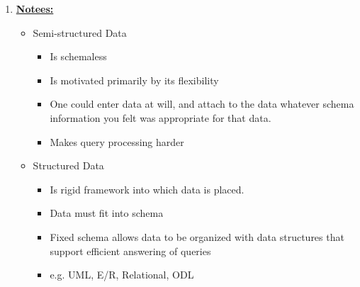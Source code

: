 \documentclass[12pt]{article}
\begin{document}
\begin{enumerate}[1.]
    \item

    \bigskip

    \underline{\textbf{Notees:}}

    \bigskip

    \begin{itemize}
        \item Semi-structured Data
        \begin{itemize}
            \item Is schemaless
            \item Is motivated primarily by its flexibility
            \item One could enter data at will, and attach to the data whatever schema information
            you felt was appropriate for that data.
            \item Makes query processing harder
        \end{itemize}
        \item Structured Data
        \begin{itemize}
            \item Is rigid framework into which data is placed.
            \item Data must fit into schema
            \item Fixed schema allows data to be organized with data structures
            that support efficient answering of queries
            \item e.g. UML, E/R, Relational, ODL
        \end{itemize}
    \end{itemize}

\end{enumerate}
\end{document}
